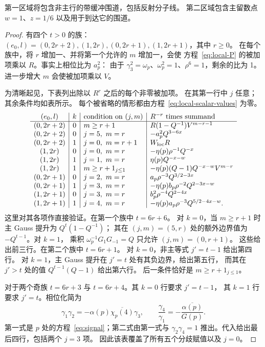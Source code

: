 \documentclass[11pt,a4paper]{article}
\numberwithin{equation}{section}
\numberwithin{figure}{section}
\theoremstyle{definition}
\theoremstyle{remark}
\begin{document}
第一区域将包含非主行的带缓冲围道，包括反射分子线。
第二区域包含主留数点 $w=1$、$z=1/6$ 以及用于到达它的围道。

\begin{proof}
有四个 $t>0$ 的族：
$(e_0,l)=(0,2r+2),(1,2r),(0,2r+1),(1,2r+1)$，其中 $r\ge0$。
在每个族中，将 $r$ 增加一、并将第一个允许的 $m$ 增加一，会使
方程~\eqref{eq:local-P} 的被加项乘以 $R$。事实上相位比为 $a_p^2$：
由于 $\gamma_3^2=\omega_p$、$\omega_p^2=1$、$\rho^6=1$，剩余的比为 1。
进一步增大 $m$ 会使被加项乘以 $V$。

为清晰起见，下表列出除以 $R^r$ 之后的每个非零被加项。
在其第一行中 $j$ 任意；其余条件均如表所示。
每个被省略的情形都由方程~\eqref{eq:local-scalar-values} 为零。
\begin{equation}\label{eq:local-family-table}
\begin{array}{c|c|l|l}
 (e_0,l)&k&\text{condition on }(j,m)&R^{-r}\text{ times summand}\\\hline
 (0,2r+2)&0&m\ge r+1&R(1-Q^{-1})V^{m-r-1}\\
 (0,2r+2)&0&j=5,\ m=r&-a_p^2Q^{3-6x}\\
 (0,2r+2)&1&j=0,\ m=r+1&W_{\rm loc}R\\
 (1,2r)&0&j=0,\ m=r&-\eta(p)\rho^{-1}Q^{-x}\\
 (1,2r)&1&j=1,\ m=r&\eta(p)Q^{-x-w}\\
 (1,2r)&1&m\ge r+1_{j\le1}&-\eta(p)(Q-1)Q^{-x-w}V^{m-r}\\
 (0,2r+1)&0&j=2,\ m=r&a_p\rho^{-3}Q^{3/2-3x}\\
 (0,2r+1)&1&j=3,\ m=r&-\eta(p)b_p\rho^{-2}Q^{2-3x-w}\\
 (1,2r+1)&0&j=3,\ m=r&b_p^2\rho^{-4}Q^{2-4x}\\
 (1,2r+1)&1&j=4,\ m=r&-\eta(p)a_p\rho^{-3}Q^{5/2-4x-w}.
\end{array}
\end{equation}
这里对其各项作直接验证。在第一个族中 $t=6r+6$。
对 $k=0$，当 $m\ge r+1$ 时主 Gauss 提升为 $Q^t(1-Q^{-1})$；
其在 $(j,m)=(5,r)$ 处的额外边界值为 $-Q^{t-1}$。对 $k=1$，
乘积 $\omega_p^{-1}G_1G_{-1}=Q$ 只允许 $(j,m)=(0,r+1)$。
这些给出前三行。在第二个族中 $t=6r+1$。
对 $k=0$，非主等式 $j'=t-1$ 给出第四行。
对 $k=1$，主 Gauss 提升在 $j'=t$ 处有其负边界，给出第五行，
而其在 $j'>t$ 处的值 $Q^{t-1}(Q-1)$ 给出第六行。
后一条件恰好是 $m\ge r+1_{j\le1}$。

对于两个奇族 $t=6r+3$ 与 $t=6r+4$。其 $k=0$ 行要求 $j'=t-1$，
其 $k=1$ 行要求 $j'=t$。相位化简为
\[
 \gamma_1\gamma_2
       =-\alpha(p)\overline{\chi_p(4)}\gamma_3,
 \qquad
 \frac{\gamma_4}{\gamma_1}
       =-\frac{\overline{\alpha(p)}}{G(p)}.
\]
第一式是 $p$ 处的方程~\eqref{eq:signal}；第二式由第一式与
$\gamma_2\gamma_4=1$ 推出。代入给出最后四行，包括两个 $j=3$ 项。
因此该表覆盖了所有五个分歧赋值以及 $j=0$。


\end{proof}
\end{document}

